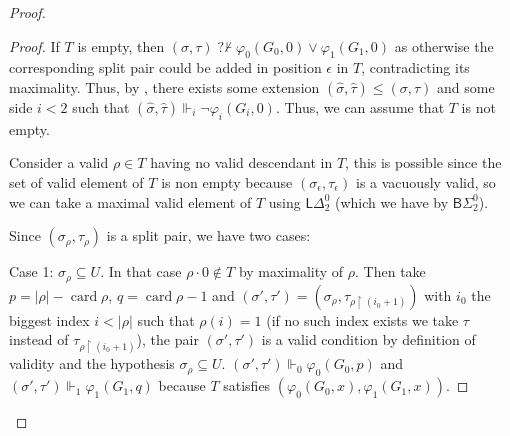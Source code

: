 \documentclass{article}
\numberwithin{theorem}{section}
\newtheorem{lemma}[theorem]{Lemma}
\newcommand{\nqvdash}{\operatorname{{?}{\nvdash}}}
\newcommand{\BSig}{\mathsf{B}\Sigma^0}
\newcommand{\uh}[0]{{\upharpoonright}}
\newcommand{\card}{\operatorname{card}}
\begin{document}
\begin{proof}
\begin{proof}
If $T$ is empty, then $(\sigma,\tau) \nqvdash \varphi_0(G_0,0) \vee \varphi_1(G_1,0)$ as otherwise the corresponding split pair could be added in position $\epsilon$ in $T$, contradicting its maximality. Thus, by , there exists some extension $(\hat \sigma, \hat \tau) \leq (\sigma, \tau)$ and some side $i < 2$ such that $(\hat \sigma, \hat \tau) \Vdash_i \neg \varphi_i(G_i,0)$. Thus, we can assume that $T$ is not empty.


Consider a valid $\rho \in T$ having no valid descendant in $T$, this is possible since the set of valid element of $T$ is non empty because $(\sigma_\epsilon, \tau_\epsilon)$ is a vacuously valid, so we can take a maximal valid element of $T$ using $\mathsf{L}\Delta^0_2$ (which we have by $\BSig_2$).

Since $(\sigma_\rho, \tau_\rho)$ is a split pair, we have two cases:

Case 1: $\sigma_{\rho} \subseteq U$. In that case $\rho \cdot 0 \notin T$ by maximality of $\rho$. Then take $p = |\rho| - \card \rho$, $q = \card \rho - 1$ and $(\sigma', \tau') = (\sigma_{\rho}, \tau_{\rho \uh (i_0+1)})$ with $i_0$ the biggest index $i < |\rho|$ such that $\rho(i) = 1$ (if no such index exists we take $\tau$ instead of $\tau_{\rho \uh (i_0+1)}$), the pair $(\sigma', \tau')$ is a valid condition by definition of validity and the hypothesis $\sigma_{\rho} \subseteq U$. $(\sigma', \tau') \Vdash_0 \varphi_0(G_0, p)$ and $(\sigma', \tau') \Vdash_1 \varphi_1(G_1,q)$ because $T$ satisfies $(\varphi_0(G_0, x), \varphi_1(G_1,x))$. 


\end{proof}
\end{proof}
\end{document}
